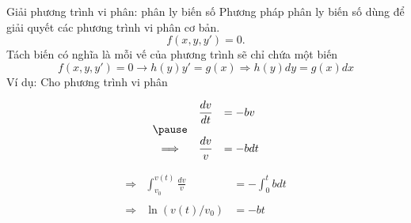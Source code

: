 \begin{frame}{Giải phương trình vi phân: phân ly biến số}
    Phương pháp phân ly biến số dùng để giải quyết các phương trình vi phân cơ bản.
    \begin{equation*}
        f(x,y,y') = 0 .
    \end{equation*}
    Tách biến có nghĩa là mỗi vế của phương trình sẽ chỉ chứa một biến
    \begin{equation}
        f(x,y,y') = 0  \longrightarrow h(y) y' = g(x) \Longrightarrow{h(y) dy = g(x) dx}
    \end{equation}
    Ví dụ: Cho phương trình vi phân


    \begin{center}
        \begin{minipage}{0.45\linewidth}
            \begin{equation*}
                \begin{array}{ccl}
                &\displaystyle \frac{dv}{dt} &= -bv \\
                \pause 
                \\
                \Longrightarrow &\displaystyle \frac{dv}{v} &= -b dt \\
                \end{array} 
            \end{equation*}
        \end{minipage}
        \hspace{1mm}
        \begin{minipage}{0.5\linewidth}
            \begin{equation*}
                \begin{array}{ccl}
                \Longrightarrow &\displaystyle \int_{v_0}^{v(t)} \frac{dv}{v} &=\displaystyle  -\int_{0}^{t} b dt \\
                \\
                \Longrightarrow & \ln (v(t)/v_0)  &= -bt \\
                \end{array}  
            \end{equation*}
        \end{minipage}
    \end{center}
\end{frame}